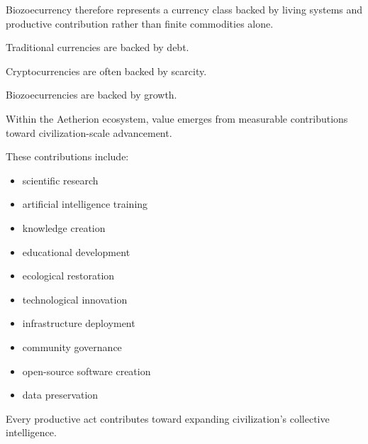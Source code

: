 ﻿\documentclass[12pt]{article}
\begin{document}
Biozoecurrency therefore represents a currency class backed by living systems and productive contribution rather than finite commodities alone.

Traditional currencies are backed by debt.

Cryptocurrencies are often backed by scarcity.

Biozoecurrencies are backed by growth.

Within the Aetherion ecosystem, value emerges from measurable contributions toward civilization-scale advancement.

These contributions include:

\begin{itemize}
  \item scientific research
\end{itemize}
\begin{itemize}
  \item artificial intelligence training
\end{itemize}
\begin{itemize}
  \item knowledge creation
\end{itemize}
\begin{itemize}
  \item educational development
\end{itemize}
\begin{itemize}
  \item ecological restoration
\end{itemize}
\begin{itemize}
  \item technological innovation
\end{itemize}
\begin{itemize}
  \item infrastructure deployment
\end{itemize}
\begin{itemize}
  \item community governance
\end{itemize}
\begin{itemize}
  \item open-source software creation
\end{itemize}
\begin{itemize}
  \item data preservation
\end{itemize}

Every productive act contributes toward expanding civilization's collective intelligence.
\end{document}
